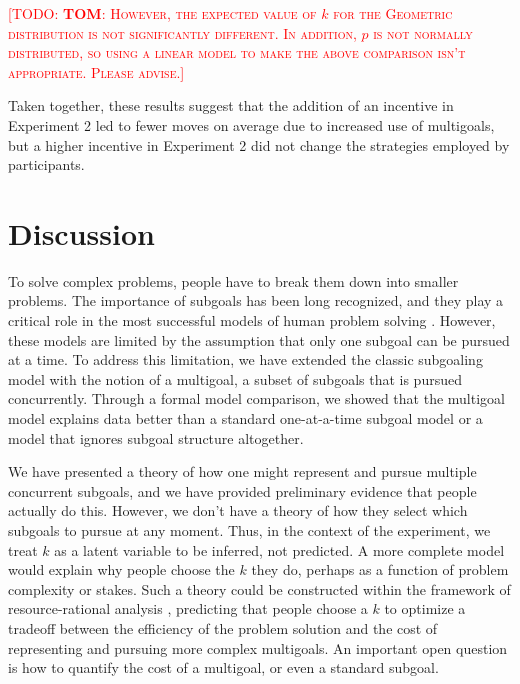 \documentclass[10pt,letterpaper]{article}
\newcommand{\todo}[1]{\textcolor{red}{\textsc{[TODO: #1]}}}
\begin{document}
\todo{\textbf{\Large TOM}: However, the expected value of $k$ for the Geometric distribution is not significantly different. In addition, $p$ is not normally distributed, so using a linear model to make the above comparison isn't appropriate. Please advise.}

Taken together, these results suggest that the addition of an incentive in Experiment 2 led to fewer moves on average due to increased use of multigoals, but a higher incentive in Experiment 2 did not change the strategies employed by participants.

\section{Discussion}
  
To solve complex problems, people have to break them down into smaller problems. The importance of subgoals has been long recognized, and they play a critical role in the most successful models of human problem solving \citep{anderson2013architecture,NewellSimon1972,laird1987soar}. However, these models are limited by the assumption that only one subgoal can be pursued at a time. To address this limitation, we have extended the classic subgoaling model with the notion of a multigoal, a subset of subgoals that is pursued concurrently. Through a formal model comparison, we showed that the multigoal model explains data better than a standard one-at-a-time subgoal model or a model that ignores subgoal structure altogether.

We have presented a theory of how one might represent and pursue multiple concurrent subgoals, and we have provided preliminary evidence that people actually do this. However, we don't have a theory of how they select which subgoals to pursue at any moment. Thus, in the context of the experiment, we treat $k$ as a latent variable to be inferred, not predicted. A more complete model would explain why people choose the $k$ they do, perhaps as a function of problem complexity or stakes. Such a theory could be constructed within the framework of resource-rational analysis \citep{Griffiths2014}, predicting that people choose a $k$ to optimize a tradeoff between the efficiency of the problem solution and the cost of representing and pursuing more complex multigoals. An important open question is how to quantify the cost of a multigoal, or even a standard subgoal.
\end{document}

